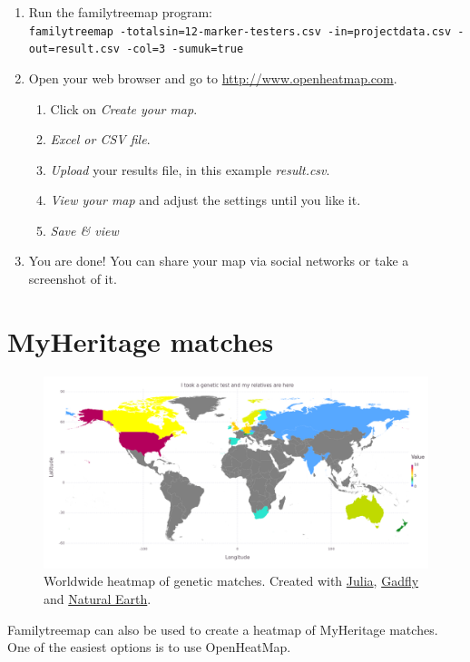 \documentclass[12pt,a4paper]{article}
\begin{document}
\begin{enumerate}
\item Run the familytreemap program:\\
  \texttt{familytreemap -totalsin=12-marker-testers.csv -in=projectdata.csv -out=result.csv -col=3 -sumuk=true}
\item Open your web browser and go to
      \href{http://www.openheatmap.com/}{http://www.openheatmap.com}.
	\begin{enumerate}
	\item Click on \emph{Create your map}.
	\item \emph{Excel or CSV file}.
	\item \emph{Upload} your results file,
            in this example \emph{result.csv}.
	\item \emph{View your map} and adjust the settings until you like it.
	\item \emph{Save \& view}
	\end{enumerate}
\item You are done! You can share your map via social networks
  or take a screenshot of it.
\end{enumerate}


\section{MyHeritage matches}

\begin{figure}[ht]
\centering
\includegraphics[width=13cm]{heatmap.png}
\caption{Worldwide heatmap of genetic matches.
Created with \href{https://julialang.org/}{Julia},
\href{http://gadflyjl.org/}{Gadfly} and
\href{http://www.naturalearthdata.com/}{Natural Earth}.}
\end{figure}

Familytreemap can also be used to create a heatmap of
MyHeritage matches. One of the easiest options is to use
OpenHeatMap.
\end{document}
